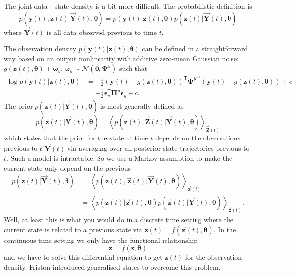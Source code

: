 \documentclass[a4paper,10pt]{article}
\newcommand{\bs}[1]{\mathbf{#1}}					%
\newcommand{\bgs}[1]{\boldsymbol{#1}}				%
\newcommand{\tr}{\mathsf{T}}				%
\newcommand{\eq}[1]{\begin{equation} #1 \end{equation}}%
\renewcommand{\ss}{z}         %
\newcommand{\so}{y}         %
\newcommand{\spe}{\epsilon} %
\renewcommand{\sp}{\theta}    %
\newcommand{\ps}{\bs{\ss}}    %
\newcommand{\po}{\bs{\so}}    %
\newcommand{\ppe}{\bgs{\spe}} %
\newcommand{\pp}{\bgs{\sp}} %
\newcommand{\Ps}{\bs{Z}}    %
\newcommand{\Po}{\bs{Y}}    %
\newcommand{\E}[2][]{\left\langle #2 \right\rangle_{#1}}	%
\newcommand{\N}{\mathcal{N}}			%
\newcommand{\Prec}{\bgs{\Pi}}			%
\begin{document}
The joint data - state density is a bit more difficult. The probabilistic definition is
\eq{
    p(\po(t),\ps(t)|\vec{\Po}(t),\pp) = p(\po(t)|\ps(t),\pp)p(\ps(t)|\vec{\Po}(t),\pp)
}
where $\vec{\Po}(t)$ is all data observed previous to time $t$.

The observation density $p(\po(t)|\ps(t),\pp)$ can be defined in a straightforward way based on an output nonlinearity with additive zero-mean Gaussian noise: $g(\ps(t),\pp)+\bgs{\omega}_\so$, $\bgs{\omega}_\so\sim \N(\bs{0},\bgs{\Psi}^\so)$ such that
\begin{align}
    \log p(\po(t)|\ps(t),\pp) &= -\frac{1}{2}(\po(t) - g(\ps(t),\pp))^\tr\bgs{\Psi}^{\so^{-1}}(\po(t) - g(\ps(t),\pp)) + c\\
    &= -\frac{1}{2}\ppe_\so^\tr\Prec^{\so}\ppe_\so + c.
\end{align}
The prior $p(\ps(t)|\vec{\Po}(t),\pp)$ is most generally defined as
\eq{
    p(\ps(t)|\vec{\Po}(t),\pp) = \E[\vec{\Ps}(t)]{p(\ps(t),\vec{\Ps}(t)|\vec{\Po}(t),\pp)}
}
which states that the prior for the state at time $t$ depends on the observations previous to $t$ $\vec{\Po}(t)$ via averaging over all posterior state trajectories previous to $t$. Such a model is intractable. So we use a Markov assumption to make the current state only depend on the previous
\begin{align}
    p(\ps(t)|\vec{\Po}(t),\pp) &= \E[\vec{\ps}(t)]{p(\ps(t),\vec{\ps}(t)|\vec{\Po}(t),\pp)}\\
    &= \label{eq:statePrior} \E[\vec{\ps}(t)]{p(\ps(t)|\vec{\ps}(t),\pp)p(\vec{\ps}(t)|\vec{\Po}(t),\pp)}.
\end{align}
Well, at least this is what you would do in a discrete time setting where the current state is related to a previous state via $\ps(t) = f(\vec{\ps}(t),\pp)$. In the continuous time setting we only have the functional relationship
\eq{
    \dot{\ps} = f(\ps,\pp)
}
and we have to solve this differential equation to get $\ps(t)$ for the observation density. Friston introduced generalised states to overcome this problem. 
\end{document}
